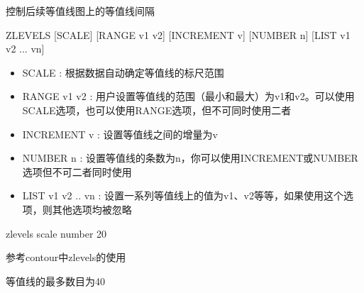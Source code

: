 \label{cmd:zlevels}

控制后续等值线图上的等值线间隔

\begin{SACSTX}
ZLEVELS [SCALE] [RANGE v1 v2] [INCREMENT v] [NUMBER n] [LIST v1 v2 ... vn]
\end{SACSTX}

\begin{itemize}
\item SCALE : 根据数据自动确定等值线的标尺范围 
\item RANGE v1 v2 : 用户设置等值线的范围（最小和最大）为v1和v2。可以使用SCALE选项，也可以使用RANGE选项，但不可同时使用二者 
\item INCREMENT v : 设置等值线之间的增量为v 
\item NUMBER n :  设置等值线的条数为n，你可以使用INCREMENT或NUMBER选项但不可二者同时使用 
\item LIST v1 v2 .. vn : 设置一系列等值线上的值为v1、v2等等，如果使用这个选项，则其他选项均被忽略 
\end{itemize}

\begin{SACDFT}
zlevels scale number 20
\end{SACDFT}

参考contour中zlevels的使用

等值线的最多数目为40

